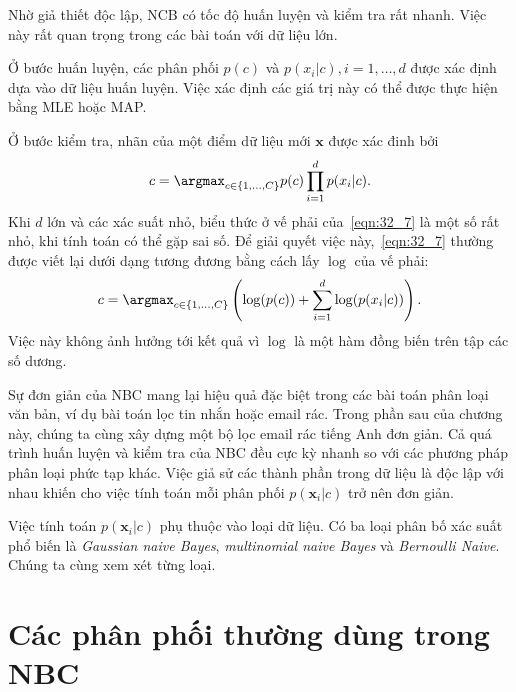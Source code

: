 Nhờ giả thiết độc lập, NCB có tốc độ huấn luyện và
kiểm tra rất nhanh. Việc này rất quan trọng trong các bài toán với dữ liệu lớn.
 
Ở bước huấn luyện, các phân phối $p(c)$ và $p(x_i | c), i = 1, \dots, d$ được xác định dựa vào dữ liệu huấn luyện. Việc xác định các giá trị này có thể được thực hiện bằng MLE hoặc MAP. 
 
Ở bước kiểm tra, nhãn của một điểm dữ liệu mới $\mathbf{x}$ được xác đinh bởi
\begin{equation} 
\label{eqn:32_7}
c = \argmax_{c \in \{1, \dots, C\}} p(c) \prod_{i=1}^d p(x_i | c).
\end{equation} 
Khi $d$ lớn và các xác suất nhỏ, biểu thức ở vế phải của~\eqref{eqn:32_7} là một
số rất nhỏ, khi tính toán có thể gặp sai số. Để giải quyết việc
này,~\eqref{eqn:32_7} thường được viết lại dưới dạng tương đương bằng cách lấy
$\log$ của vế phải:
\begin{equation} 
\label{eqn:32_7_1}
c = \argmax_{c \in \{1, \dots, C\}} \left(\log(p(c)) + \sum_{i=1}^d \log(p(x_i
| c))\right).
\end{equation} 
Việc này không ảnh hưởng tới kết quả vì $\log$ là một hàm đồng biến trên tập các số dương.  
 
Sự đơn giản của NBC mang lại hiệu quả đặc biệt trong các bài toán phân loại văn
bản, ví dụ bài toán lọc tin nhắn hoặc email rác. Trong phần sau của
chương này, chúng ta cùng xây dựng một bộ lọc email rác tiếng Anh đơn giản.
Cả quá trình huấn luyện và kiểm tra của NBC đều cực kỳ nhanh so với các phương
pháp phân loại phức tạp khác. Việc giả sử các thành phần trong dữ liệu là độc
lập với nhau khiến cho việc tính toán mỗi phân phối $p(\mathbf{x}_i|c)$ trở nên đơn giản.
 
 
Việc tính toán $p(\mathbf{x}_i | c) $ phụ thuộc vào loại dữ liệu. Có ba loại
phân bố xác suất phổ biến là \textit{Gaussian naive Bayes},
\textit{multinomial naive Bayes} và \textit{Bernoulli Naive}. Chúng ta cùng xem xét  từng loại.
 
 
 
 
 
\section{Các phân phối thường dùng trong NBC}
 
 
